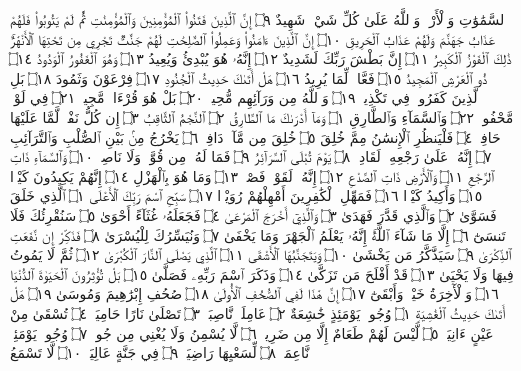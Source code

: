 ٱلسَّمَٰوَٰتِ وَٱلْأَرْضِۚ وَٱللَّهُ عَلَىٰ كُلِّ شَيْءࣲ شَهِيدٌ ۝٩ إِنَّ ٱلَّذِينَ
فَتَنُوا۟ ٱلْمُؤْمِنِينَ وَٱلْمُؤْمِنَٰتِ ثُمَّ لَمْ يَتُوبُوا۟ فَلَهُمْ عَذَابُ جَهَنَّمَ وَلَهُمْ
عَذَابُ ٱلْحَرِيقِ ۝١٠ إِنَّ ٱلَّذِينَ ءَامَنُوا۟ وَعَمِلُوا۟ ٱلصَّٰلِحَٰتِ لَهُمْ
جَنَّٰتࣱ تَجْرِي مِن تَحْتِهَا ٱلْأَنْهَٰرُۚ ذَٰلِكَ ٱلْفَوْزُ ٱلْكَبِيرُ ۝١١ إِنَّ بَطْشَ
رَبِّكَ لَشَدِيدٌ ۝١٢ إِنَّهُۥ هُوَ يُبْدِئُ وَيُعِيدُ ۝١٣ وَهُوَ ٱلْغَفُورُ ٱلْوَدُودُ ۝١٤
ذُو ٱلْعَرْشِ ٱلْمَجِيدُ ۝١٥ فَعَّالࣱ لِّمَا يُرِيدُ ۝١٦ هَلْ أَتَىٰكَ حَدِيثُ
ٱلْجُنُودِ ۝١٧ فِرْعَوْنَ وَثَمُودَ ۝١٨ بَلِ ٱلَّذِينَ كَفَرُوا۟ فِي تَكْذِيبࣲ ۝١٩ وَٱللَّهُ
مِن وَرَآئِهِم مُّحِيطُۢ ۝٢٠ بَلْ هُوَ قُرْءَانࣱ مَّجِيدࣱ ۝٢١ فِي لَوْحࣲ مَّحْفُوظِۭ ۝٢٢
وَٱلسَّمَآءِ وَٱلطَّارِقِ ۝١ وَمَآ أَدْرَىٰكَ مَا ٱلطَّارِقُ ۝٢ ٱلنَّجْمُ ٱلثَّاقِبُ ۝٣
إِن كُلُّ نَفْسࣲ لَّمَّا عَلَيْهَا حَافِظࣱ ۝٤ فَلْيَنظُرِ ٱلْإِنسَٰنُ مِمَّ خُلِقَ ۝٥
خُلِقَ مِن مَّآءࣲ دَافِقࣲ ۝٦ يَخْرُجُ مِنۢ بَيْنِ ٱلصُّلْبِ وَٱلتَّرَآئِبِ ۝٧ إِنَّهُۥ
عَلَىٰ رَجْعِهِۦ لَقَادِرࣱ ۝٨ يَوْمَ تُبْلَى ٱلسَّرَآئِرُ ۝٩ فَمَا لَهُۥ مِن قُوَّةࣲ وَلَا
نَاصِرࣲ ۝١٠ وَٱلسَّمَآءِ ذَاتِ ٱلرَّجْعِ ۝١١ وَٱلْأَرْضِ ذَاتِ ٱلصَّدْعِ ۝١٢
إِنَّهُۥ لَقَوْلࣱ فَصْلࣱ ۝١٣ وَمَا هُوَ بِٱلْهَزْلِ ۝١٤ إِنَّهُمْ يَكِيدُونَ كَيْدࣰا ۝١٥
وَأَكِيدُ كَيْدࣰا ۝١٦ فَمَهِّلِ ٱلْكَٰفِرِينَ أَمْهِلْهُمْ رُوَيْدَۢا ۝١٧
سَبِّحِ ٱسْمَ رَبِّكَ ٱلْأَعْلَى ۝١ ٱلَّذِي خَلَقَ فَسَوَّىٰ ۝٢ وَٱلَّذِي قَدَّرَ
فَهَدَىٰ ۝٣ وَٱلَّذِيٓ أَخْرَجَ ٱلْمَرْعَىٰ ۝٤ فَجَعَلَهُۥ غُثَآءً أَحْوَىٰ ۝٥
سَنُقْرِئُكَ فَلَا تَنسَىٰٓ ۝٦ إِلَّا مَا شَآءَ ٱللَّهُۚ إِنَّهُۥ يَعْلَمُ ٱلْجَهْرَ وَمَا يَخْفَىٰ ۝٧
وَنُيَسِّرُكَ لِلْيُسْرَىٰ ۝٨ فَذَكِّرْ إِن نَّفَعَتِ ٱلذِّكْرَىٰ ۝٩ سَيَذَّكَّرُ مَن يَخْشَىٰ ۝١٠
وَيَتَجَنَّبُهَا ٱلْأَشْقَى ۝١١ ٱلَّذِي يَصْلَى ٱلنَّارَ ٱلْكُبْرَىٰ ۝١٢ ثُمَّ لَا يَمُوتُ
فِيهَا وَلَا يَحْيَىٰ ۝١٣ قَدْ أَفْلَحَ مَن تَزَكَّىٰ ۝١٤ وَذَكَرَ ٱسْمَ رَبِّهِۦ فَصَلَّىٰ ۝١٥
بَلْ تُؤْثِرُونَ ٱلْحَيَوٰةَ ٱلدُّنْيَا ۝١٦ وَٱلْأٓخِرَةُ خَيْرࣱ وَأَبْقَىٰٓ ۝١٧ إِنَّ
هَٰذَا لَفِي ٱلصُّحُفِ ٱلْأُولَىٰ ۝١٨ صُحُفِ إِبْرَٰهِيمَ وَمُوسَىٰ ۝١٩
هَلْ أَتَىٰكَ حَدِيثُ ٱلْغَٰشِيَةِ ۝١ وُجُوهࣱ يَوْمَئِذٍ خَٰشِعَةٌ ۝٢ عَامِلَةࣱ
نَّاصِبَةࣱ ۝٣ تَصْلَىٰ نَارًا حَامِيَةࣰ ۝٤ تُسْقَىٰ مِنْ عَيْنٍ ءَانِيَةࣲ ۝٥ لَّيْسَ
لَهُمْ طَعَامٌ إِلَّا مِن ضَرِيعࣲ ۝٦ لَّا يُسْمِنُ وَلَا يُغْنِي مِن جُوعࣲ ۝٧ وُجُوهࣱ
يَوْمَئِذࣲ نَّاعِمَةࣱ ۝٨ لِّسَعْيِهَا رَاضِيَةࣱ ۝٩ فِي جَنَّةٍ عَالِيَةࣲ ۝١٠ لَّا تَسْمَعُ
